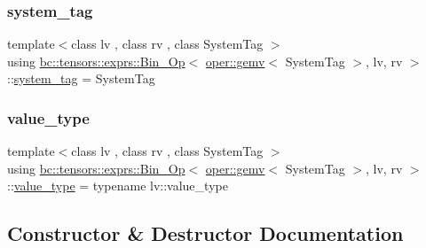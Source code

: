 \subsubsection{\texorpdfstring{system\+\_\+tag}{system\_tag}}
{\footnotesize\ttfamily template$<$class lv , class rv , class System\+Tag $>$ \\
using \hyperlink{structbc_1_1tensors_1_1exprs_1_1Bin__Op}{bc\+::tensors\+::exprs\+::\+Bin\+\_\+\+Op}$<$ \hyperlink{structbc_1_1oper_1_1gemv}{oper\+::gemv}$<$ System\+Tag $>$, lv, rv $>$\+::\hyperlink{structbc_1_1tensors_1_1exprs_1_1Bin__Op_3_01oper_1_1gemv_3_01SystemTag_01_4_00_01lv_00_01rv_01_4_a18ec8659904c80f74cf3c865349e0785}{system\+\_\+tag} =  System\+Tag}

\mbox{\label{structbc_1_1tensors_1_1exprs_1_1Bin__Op_3_01oper_1_1gemv_3_01SystemTag_01_4_00_01lv_00_01rv_01_4_a1fc7a37a4a658815b1d29c9bc473dbe1}} 
\subsubsection{\texorpdfstring{value\+\_\+type}{value\_type}}
{\footnotesize\ttfamily template$<$class lv , class rv , class System\+Tag $>$ \\
using \hyperlink{structbc_1_1tensors_1_1exprs_1_1Bin__Op}{bc\+::tensors\+::exprs\+::\+Bin\+\_\+\+Op}$<$ \hyperlink{structbc_1_1oper_1_1gemv}{oper\+::gemv}$<$ System\+Tag $>$, lv, rv $>$\+::\hyperlink{structbc_1_1tensors_1_1exprs_1_1Bin__Op_3_01oper_1_1gemv_3_01SystemTag_01_4_00_01lv_00_01rv_01_4_a1fc7a37a4a658815b1d29c9bc473dbe1}{value\+\_\+type} =  typename lv\+::value\+\_\+type}



\subsection{Constructor \& Destructor Documentation}
\mbox{\label{structbc_1_1tensors_1_1exprs_1_1Bin__Op_3_01oper_1_1gemv_3_01SystemTag_01_4_00_01lv_00_01rv_01_4_adc4a8b309f32fb758e2463600050d462}} 
